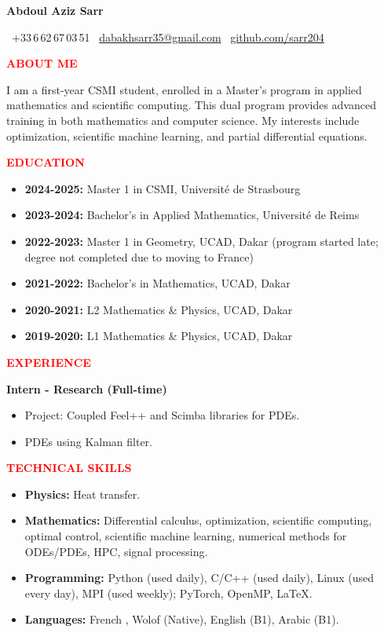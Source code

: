 \documentclass[12pt,a4paper]{article}
\newcommand{\cvsection}[1]{%
  \vspace{10pt}
  \noindent\makebox[\linewidth]{\rule{\textwidth}{1.5pt}}
  \vspace{2pt}
  \noindent\textcolor{red}{\textbf{\LARGE #1}}
  \vspace{2pt}
  \noindent\makebox[\linewidth]{\rule{\textwidth}{0.5pt}}
  \vspace{6pt}
}
\begin{document}
\begin{center}
  {\Huge \textbf{Abdoul Aziz Sarr}}
  
  \faPhone\ +33\,6\,62\,67\,03\,51\quad
  \faEnvelope\ \href{mailto:dabakhsarr35@gmail.com}{dabakhsarr35@gmail.com} \quad
  \faGithub\ \href{https://github.com/sarr204}{github.com/sarr204}
\end{center}

\vspace{10pt}

\cvsection{ABOUT ME}
I am a first-year CSMI student, enrolled in a Master's program in applied mathematics and scientific computing. This dual program provides advanced training in both mathematics and computer science. My interests include optimization, scientific machine learning, and partial differential equations.

\cvsection{EDUCATION}
\begin{itemize}[leftmargin=*,itemsep=3pt]
  \item \textbf{2024-2025:} Master 1 in CSMI, Université de Strasbourg
  \item \textbf{2023-2024:} Bachelor's in Applied Mathematics, Université de Reims
  \item \textbf{2022-2023:} Master 1 in Geometry, UCAD, Dakar (program started late; degree not completed due to moving to France)
  \item \textbf{2021-2022:} Bachelor's in Mathematics, UCAD, Dakar
  \item \textbf{2020-2021:} L2 Mathematics \& Physics, UCAD, Dakar
  \item \textbf{2019-2020:} L1 Mathematics \& Physics, UCAD, Dakar
\end{itemize}

\cvsection{EXPERIENCE}
\textbf{Intern - Research (Full-time)}
\begin{itemize}[leftmargin=*,noitemsep]
  \item Project: Coupled Feel++ and Scimba libraries for PDEs.
  \item PDEs using Kalman filter.
\end{itemize}

\cvsection{TECHNICAL SKILLS}
\begin{itemize}[leftmargin=*,noitemsep]
\item \textbf{Physics:} Heat transfer.
  \item \textbf{Mathematics:} Differential calculus, optimization, scientific computing, optimal control, scientific machine learning, numerical methods for ODEs/PDEs, HPC, signal processing.
  \item \textbf{Programming:} Python (used daily), C/C++ (used daily), Linux (used every day), MPI (used weekly); PyTorch, OpenMP, \LaTeX.
  \item \textbf{Languages:} French , Wolof (Native), English (B1), Arabic (B1).
\end{itemize}
\end{document}

